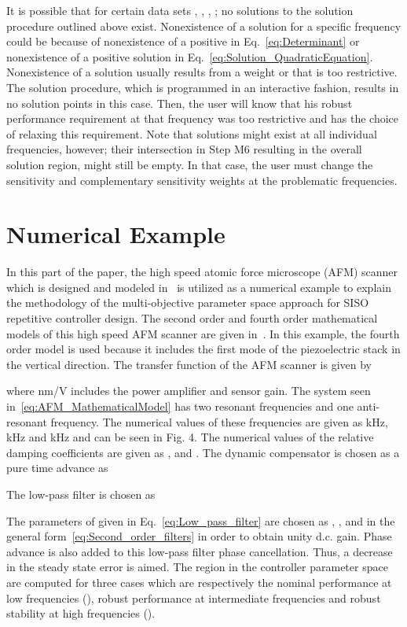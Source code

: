 \documentclass[12pt,draftcls,onecolumn]{IEEEtran}
\begin{document}
It is possible that for certain data sets , ,
, ; no solutions to the solution procedure outlined
above exist. Nonexistence of a solution for a specific frequency
 could be because of nonexistence of a positive
 in Eq.~\eqref{eq:Determinant} or nonexistence of a positive solution
 in Eq.~\eqref{eq:Solution_QuadraticEquation}. Nonexistence of a solution usually results from
a weight  or  that is too restrictive. The
solution procedure, which is programmed in an interactive fashion,
results in no solution points in this case. Then, the user will
know that his robust performance requirement at that frequency was
too restrictive and has the choice of relaxing this requirement.
Note that solutions might exist at all individual frequencies,
however; their intersection in Step M6 resulting in the overall
solution region, might still be empty. In that case, the user must
change the sensitivity and complementary sensitivity weights at
the problematic frequencies.

\section{Numerical Example}

In this part of the paper, the high speed atomic force microscope (AFM) scanner which is designed and modeled in~\cite{SAD+:07} is utilized as a numerical example to explain the methodology of the multi-objective parameter space approach for SISO repetitive controller design. The second order and fourth order mathematical models of this high speed AFM scanner are given in~\cite{SAD+:07}. In this example, the fourth order model is used because it includes the first mode of the piezoelectric stack in the vertical direction. The transfer function of the AFM scanner is given by

where nm/V includes the power amplifier and sensor gain. The system seen in~\eqref{eq:AFM_MathematicalModel} has two resonant frequencies and one anti-resonant frequency. The numerical values of these frequencies are given as  kHz,  kHz and  kHz and can be seen in Fig. 4. The numerical values of the relative damping coefficients are given as ,  and . The dynamic compensator  is chosen as a pure time advance as


The low-pass filter  is chosen as


The parameters of  given in Eq.~\eqref{eq:Low_pass_filter} are chosen as , ,  and
 in the general form~\eqref{eq:Second_order_filters} in order to obtain unity d.c. gain. Phase advance is also added to this low-pass filter phase cancellation. Thus, a decrease in the steady state error is aimed. The region in the  controller parameter
space are computed for three cases which are respectively the nominal performance at low frequencies (), robust
performance at intermediate frequencies and robust stability at high frequencies ().
\end{document}
